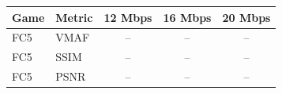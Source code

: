 \begin{tabular}{llccc}
\toprule
Game & Metric & 12 Mbps & 16 Mbps & 20 Mbps \\
\midrule
FC5 & VMAF & -- & -- & -- \\
FC5 & SSIM & -- & -- & -- \\
FC5 & PSNR & -- & -- & -- \\
\bottomrule
\end{tabular}
